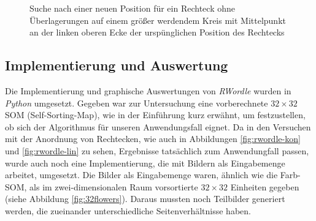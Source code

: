 \documentclass[12pt, ngerman, utf8]{article}
\begin{document}
\begin{figure}[h]
    \noindent
    \caption{Suche nach einer neuen Position für ein Rechteck ohne Überlagerungen auf einem größer werdendem Kreis mit Mittelpunkt an der linken oberen Ecke der urspünglichen Position des Rechtecks}
    \label{fig:rwordle-illus}
\end{figure}

\subsection{Implementierung und Auswertung}
Die Implementierung und graphische Auswertungen von \emph{RWordle} wurden in \emph{Python} umgesetzt.
Gegeben war zur Untersuchung eine vorberechnete $32\times32$ SOM (Self-Sorting-Map), wie in der Einführung kurz erwähnt, um festzustellen, ob sich der Algorithmus für unseren Anwendungsfall eignet. Da in den Versuchen mit der Anordnung von Rechtecken, wie auch in Abbildungen \ref{fig:rwordle-kon} und \ref{fig:rwordle-lin} zu sehen, Ergebnisse tatsächlich zum Anwendungfall passen, wurde auch noch eine Implementierung, die mit Bildern als Eingabemenge arbeitet, umgesetzt.
Die Bilder als Eingabemenge waren, ähnlich wie die Farb-SOM, als im zwei-dimensionalen Raum vorsortierte $32\times32$ Einheiten gegeben (siehe Abbildung \ref{fig:32flowers}). Daraus mussten noch Teilbilder generiert werden, die zueinander unterschiedliche Seitenverhältnisse haben.
\end{document}
